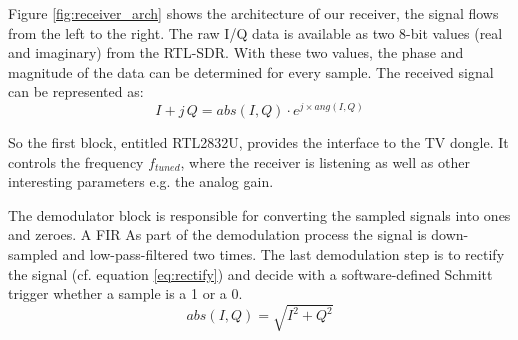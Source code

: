 \documentclass[conference]{IEEEtran}
\begin{document}
Figure \ref{fig:receiver_arch} shows the architecture of our receiver, the
signal flows from the left to the right.
The raw I/Q data is available as two 8-bit values (real and imaginary) from the
RTL-SDR. With these two values, the phase and magnitude of the data can be
determined for every sample. The received signal can be represented as:
\begin{equation}
	I+j\,Q = abs(I,Q) \cdot e^{j \times ang(I,Q)} 
\end{equation} 
 
So the first block, entitled RTL2832U, provides the interface to the TV
dongle. It controls the frequency \ensuremath{f_{tuned}}, where the
receiver is listening as well as other interesting parameters e.g. the analog gain.

The demodulator block is responsible for converting the sampled signals
into ones and zeroes. 
 A FIR
As part of the demodulation process the signal is down-sampled and
low-pass-filtered two times. The last demodulation step is to rectify
the signal (cf. equation \ref{eq:rectify}) and decide with a
software-defined Schmitt trigger whether a sample is a 1 or a 0.  
\begin{equation}
	\label{eq:rectify}
	abs(I,Q) = \sqrt{I^2 +  Q^2}
\end{equation} 
\end{document}
